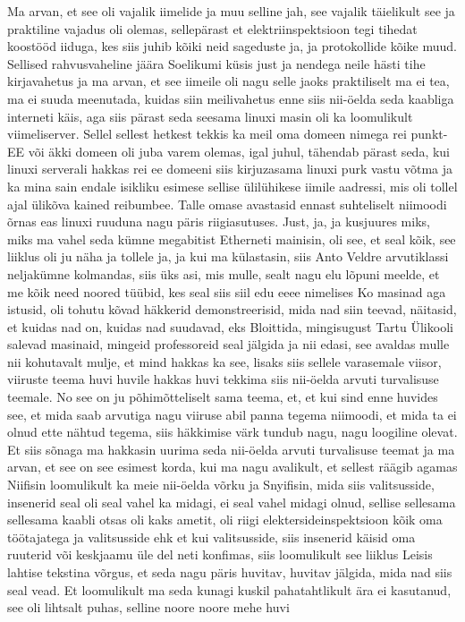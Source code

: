 Ma arvan, et see oli vajalik iimelide ja muu selline jah, see vajalik täielikult see ja praktiline vajadus oli olemas, sellepärast et elektriinspektsioon tegi tihedat koostööd iiduga, kes siis juhib kõiki neid sageduste ja, ja protokollide kõike muud. Sellised rahvusvaheline jäära Soelikumi küsis just ja nendega neile hästi tihe kirjavahetus ja ma arvan, et see iimeile oli nagu selle jaoks praktiliselt ma ei tea, ma ei suuda meenutada, kuidas siin meilivahetus enne siis nii-öelda seda kaabliga interneti käis, aga siis pärast seda seesama linuxi masin oli ka loomulikult viimeliserver. Sellel sellest hetkest tekkis ka meil oma domeen nimega rei punkt-EE või äkki domeen oli juba varem olemas, igal juhul, tähendab pärast seda, kui linuxi serverali hakkas rei ee domeeni siis kirjuzasama linuxi purk vastu võtma ja ka mina sain endale isikliku esimese sellise ülilühikese iimile aadressi, mis oli tollel ajal ülikõva kained reibumbee.
Talle omase avastasid ennast suhteliselt niimoodi õrnas eas linuxi ruuduna nagu päris riigiasutuses.
Just, ja, ja kusjuures miks, miks ma vahel seda kümne megabitist Etherneti mainisin, oli see, et seal kõik, see liiklus oli ju näha ja tollele ja, ja kui ma külastasin, siis Anto Veldre arvutiklassi neljakümne kolmandas, siis üks asi, mis mulle, sealt nagu elu lõpuni meelde, et me kõik need noored tüübid, kes seal siis siil edu eeee nimelises Ko masinad aga istusid, oli tohutu kõvad häkkerid demonstreerisid, mida nad siin teevad, näitasid, et kuidas nad on, kuidas nad suudavad, eks Bloittida, mingisugust Tartu Ülikooli salevad masinaid, mingeid professoreid seal jälgida ja nii edasi, see avaldas mulle nii kohutavalt mulje, et mind hakkas ka see, lisaks siis sellele varasemale viisor, viiruste teema huvi huvile hakkas huvi tekkima siis nii-öelda arvuti turvalisuse teemale.
No see on ju põhimõtteliselt sama teema, et, et kui sind enne huvides see, et mida saab arvutiga nagu viiruse abil panna tegema niimoodi, et mida ta ei olnud ette nähtud tegema, siis häkkimise värk tundub nagu, nagu loogiline olevat.
Et siis sõnaga ma hakkasin uurima seda nii-öelda arvuti turvalisuse teemat ja ma arvan, et see on see esimest korda, kui ma nagu avalikult, et sellest räägib agamas Niifisin loomulikult ka meie nii-öelda võrku ja Snyifisin, mida siis valitsusside, insenerid seal oli seal vahel ka midagi, ei seal vahel midagi olnud, sellise sellesama sellesama kaabli otsas oli kaks ametit, oli riigi elektersideinspektsioon kõik oma töötajatega ja valitsusside ehk et kui valitsusside, siis insenerid käisid oma ruuterid või keskjaamu üle del neti konfimas, siis loomulikult see liiklus Leisis lahtise tekstina võrgus, et seda nagu päris huvitav, huvitav jälgida, mida nad siis seal vead. Et loomulikult ma seda kunagi kuskil pahatahtlikult ära ei kasutanud, see oli lihtsalt puhas, selline noore noore mehe huvi
